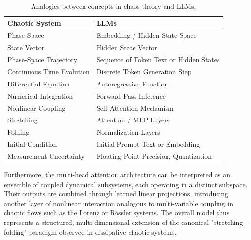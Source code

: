 \documentclass[a4paper,12pt]{article}
\begin{document}

\begin{table}[H]
\centering
\begin{tabular}{@{}ll@{}}
\toprule
\textbf{Chaotic System} & \textbf{LLMs} \\ \midrule
Phase Space & Embedding / Hidden State Space \\
State Vector & Hidden State Vector \\
Phase-Space Trajectory & Sequence of Token Text or Hidden States \\
Continuous Time Evolution & Discrete Token Generation Step \\
Differential Equation & Autoregressive Function \\
Numerical Integration & Forward-Pass Inference \\
Nonlinear Coupling & Self-Attention Mechanism \\
Stretching & Attention / MLP Layers \\
Folding & Normalization Layers \\
Initial Condition & Initial Prompt Text or Embedding \\
Measurement Uncertainty & Floating-Point Precision, Quantization \\ \bottomrule
\end{tabular}
\caption{Analogies between concepts in chaos theory and LLMs.}
\label{tab:analogy}
\end{table}

Furthermore, the multi-head attention architecture can be interpreted as an ensemble of coupled dynamical subsystems, each operating in a distinct subspace. Their outputs are combined through learned linear projections, introducing another layer of nonlinear interaction analogous to multi-variable coupling in chaotic flows such as the Lorenz or Rössler systems. The overall model thus represents a structured, multi-dimensional extension of the canonical "stretching–folding" paradigm observed in dissipative chaotic systems.
\end{document}
